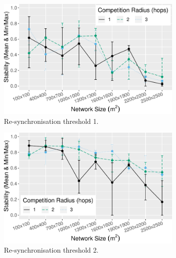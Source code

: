 \begin{figure}[bt]
\centering
\begin{subfigure}{\textwidth}
    \centering
    \includegraphics[width=\textwidth, keepaspectratio]{figure/Results/ParameterEvaluation/ResyncThreshold1_Stability.pdf}
    \caption{Re-synchronisation threshold 1.}
    \label{subfig:stability-resync-treshold-1}
\end{subfigure}
\begin{subfigure}{\textwidth}
    \centering
    \includegraphics[width=\textwidth, keepaspectratio]{figure/Results/ParameterEvaluation/ResyncThreshold2_Stability.pdf}
    \caption{Re-synchronisation threshold 2.}
    \label{subfig:stability-resync-treshold-2}
\end{subfigure}
\begin{subfigure}{\textwidth}
    \centering

\end{subfigure}
\end{figure}
